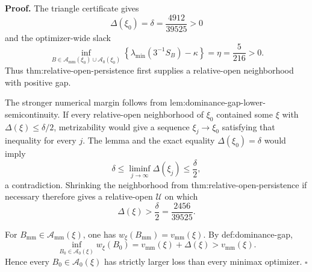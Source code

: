 \textbf{Proof.}
The triangle certificate gives
\[
\Delta(\xi_0)=\delta=\frac{4912}{39525}>0
\]
and the optimizer-wide slack
\[
\inf_{B\in\mathcal A_{\mathrm{mm}}(\xi_0)\cup\mathcal A_0(\xi_0)}
\left\{\lambda_{\min}(3^{-1}S_B)-\kappa\right\}
=\eta=\frac5{216}>0.
\]
Thus thm:relative-open-persistence first supplies a relative-open neighborhood with positive gap.

The stronger numerical margin follows from lem:dominance-gap-lower-semicontinuity.  If every relative-open neighborhood of \(\xi_0\) contained some \(\xi\) with \(\Delta(\xi)\le\delta/2\), metrizability would give a sequence \(\xi_j\to\xi_0\) satisfying that inequality for every \(j\).  The lemma and the exact equality \(\Delta(\xi_0)=\delta\) would imply
\[
\delta
\le\liminf_{j\to\infty}\Delta(\xi_j)
\le\frac{\delta}{2},
\]
a contradiction.  Shrinking the neighborhood from thm:relative-open-persistence if necessary therefore gives a relative-open \(\mathcal U\) on which
\[
\Delta(\xi)>\frac\delta2=\frac{2456}{39525}.
\]

For \(B_{\mathrm{mm}}\in\mathcal A_{\mathrm{mm}}(\xi)\), one has \(w_\xi(B_{\mathrm{mm}})=v_{\mathrm{mm}}(\xi)\).  By def:dominance-gap,
\[
\inf_{B_0\in\mathcal A_0(\xi)}w_\xi(B_0)
=v_{\mathrm{mm}}(\xi)+\Delta(\xi)
>v_{\mathrm{mm}}(\xi).
\]
Hence every \(B_0\in\mathcal A_0(\xi)\) has strictly larger loss than every minimax optimizer. \(\square\)